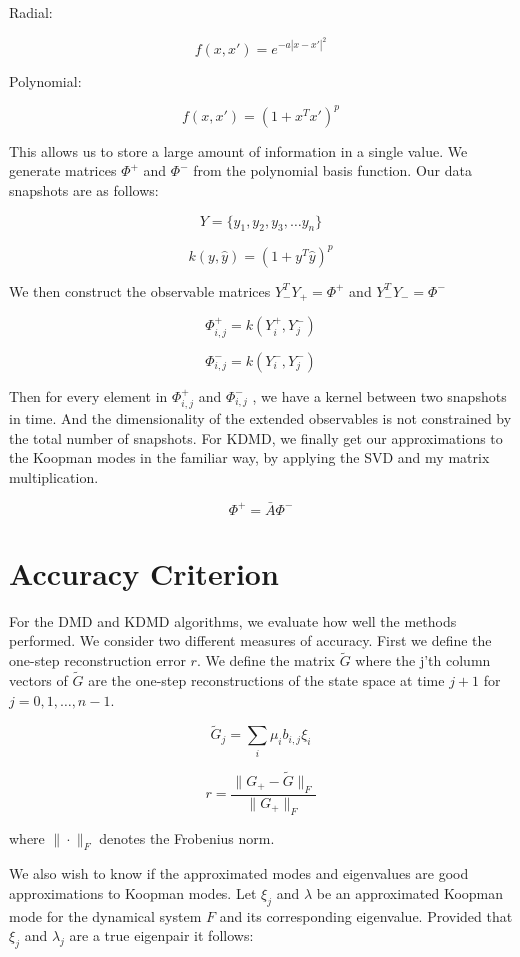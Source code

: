 \noindent Radial: 

$$
f(x,x') = e^{-a|x-x'|^2}
$$

\vspace{3mm}


\noindent Polynomial:

$$
f(x,x') = (1 + x^Tx')^p
$$

\vspace{3mm}

This allows us to store a large amount of information in a single value. We generate matrices
$\Phi^+$ and $\Phi^-$ from the polynomial basis function. Our data snapshots are as
follows:

$$
 Y = \{y_1,y_2,y_3, \dots y_n\}
$$

$$
k (y,{\hat y}) = (1 + y^T {\hat y})^p
$$

\noindent We then construct the observable matrices $Y^T_-Y_+ = \Phi^{+}$ and $Y^T_{-} Y_{-} = \Phi^{-}$

$$
\Phi^{+}_{i,j} = k(Y^{+}_{i}, Y^{-}_j)
$$

$$
\Phi^{-}_{i,j} = k(Y^{-}_{i}, Y^{-}_j)
$$

\noindent Then for every element in $\Phi^{+}_{i,j}$ and $\Phi^{-}_{i,j}$ , we have a kernel between two snapshots in time. And the dimensionality of the
extended observables is not constrained by the total number of snapshots. For KDMD, we finally get
our approximations to the Koopman modes in the familiar way, by applying the SVD and my matrix multiplication.

$$
\Phi^{+} = {\bar A} \Phi^{-}
$$

\section{Accuracy Criterion}
For the DMD and KDMD algorithms, we evaluate how
well the methods performed. We consider two different measures
of accuracy. First we define the one-step reconstruction
error $r$. We define the matrix ${\tilde G}$ where the j'th column vectors of ${\tilde G}$ are the one-step
reconstructions of the state space at time $j+1$ for $j=0,1,\dots, n-1$.

$$
{\tilde G}_{j} = \sum_{i} \mu_i b_{i,j} \xi_i
$$

$$
r = \frac{\|G_{+} - {\tilde G} \|_F}{\|G_{+}\|_F}
$$

where $\| \cdot \|_F$ denotes the Frobenius norm.

We also wish to know if the approximated modes and eigenvalues are good approximations to 
Koopman modes. Let $\xi_j$ and $\lambda$ be an approximated Koopman mode for the
 dynamical system $F$ and its corresponding eigenvalue. Provided that $\xi_j$ and $\lambda_j$ are
a true eigenpair it follows:

